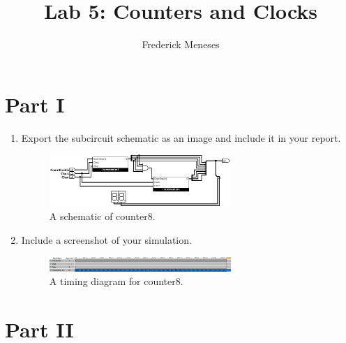 \documentclass{article}
\title{Lab 5: Counters and Clocks}
\author{Frederick Meneses}
\begin{document}
\maketitle

\section{Part I}

\begin{enumerate}
\item Export the subcircuit schematic as an image and include it in your report.

\begin{figure}[ht!]
    \centering
    \includegraphics[width=0.65\textwidth]{lab5_counter8.png}
    \caption{A schematic of counter8.}
    \label{f:counter8}
\end{figure}

\item Include a screenshot of your simulation.
\begin{figure}[ht!]
    \centering
    \includegraphics[width=0.65\textwidth]{lab5_counting8_timing.png}
    \caption{A timing diagram for counter8.}
    \label{f:counter8_timing}
\end{figure}

\end{enumerate}

\section{Part II}
\end{document}
